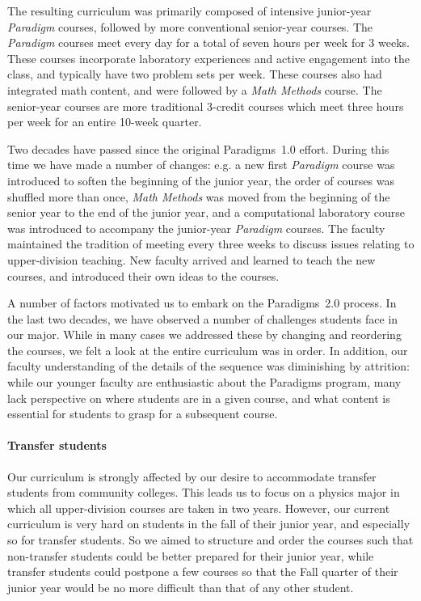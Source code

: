 \documentclass[english,aps,pra,reprint,noshowpacs,superscriptaddress]{revtex4-1}
\begin{document}
The resulting curriculum was primarily composed of intensive junior-year \emph{Paradigm}
courses, followed by more conventional senior-year courses.
The \emph{Paradigm} courses meet every day for a total of seven
hours per week for 3 weeks.  These courses incorporate
laboratory experiences and active engagement into the class, and
typically have two problem sets per week.  These courses also had
integrated math content, and were followed by a \emph{Math Methods} course.
The senior-year courses are more traditional 3-credit courses which meet
three hours per week for an entire 10-week quarter.

Two decades have passed since the original Paradigms~1.0 effort.
During this time we have made a number of changes: e.g. a new
first \emph{Paradigm} course was introduced to soften the beginning of the
junior year, the order of courses was shuffled more than once, \emph{Math
Methods} was moved from the beginning of the senior year to the end of
the junior year, and a computational laboratory course was introduced
to accompany the junior-year \emph{Paradigm} courses.  The faculty maintained the tradition of meeting
every three weeks to discuss issues relating to upper-division
teaching.  New faculty arrived and learned to teach the new courses,
and introduced their own ideas to the courses.

A number of factors motivated us to embark on the
Paradigms~2.0 process.  In the last two decades, we have observed
a number of challenges students face in our major.  While in many cases we
addressed these by changing and reordering the courses, we felt a look
at the entire curriculum was in order.
In addition, our faculty
understanding of the details of the sequence was diminishing by attrition: 
while our younger
faculty are enthusiastic about the Paradigms program, many lack perspective on
where students are in a given course, and what content is essential
for students to grasp for a subsequent course.

\paragraph{Transfer students}
Our curriculum is strongly affected by our desire to accommodate
transfer students from community colleges.  This leads us to focus on
a physics major in which all upper-division courses are taken in two
years.  However, our current curriculum is very hard on students in
the fall of their junior year, and especially so for transfer
students.  So we aimed to structure and order the courses such that non-transfer
students could be better prepared for their junior year, while
transfer students could postpone a few courses so that the
Fall quarter of their junior year would be no more difficult than that of any other student.
\end{document}
